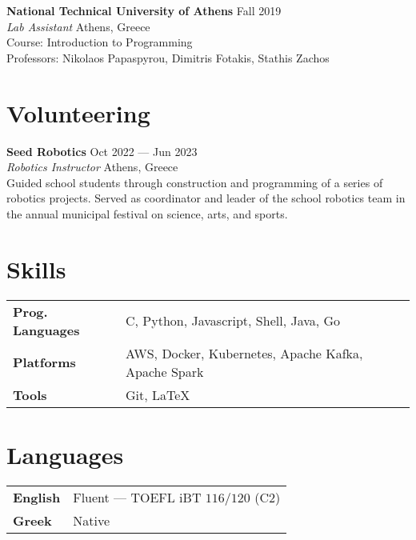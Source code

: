 \documentclass[margin, 12pt]{resume}
\newcommand{\sectionVSpace}{\vspace{-3.5ex}} %
\newcommand{\competition}[1]{\textbf{#1}\xspace}
\newcommand{\institution}[1]{\textbf{#1}\xspace}
\newcommand{\rSection}[1]{\sectionVSpace\section{#1}\xspace}
\newcommand{\role}[1]{\textit{#1}\xspace}
\newcommand{\stitle}[1]{#1:\xspace}
\begin{document}
\begin{resume}
    \institution{National Technical University of Athens} \hfill Fall 2019 \\
    \role{Lab Assistant} \hfill Athens, Greece \\
    \stitle{Course} Introduction to Programming \\
    \stitle{Professors} Nikolaos Papaspyrou, Dimitris Fotakis, Stathis Zachos \\

    \rSection{Volunteering}

    \institution{Seed Robotics} \hfill Oct 2022 --- Jun 2023 \\
    \role{Robotics Instructor} \hfill Athens, Greece \\
    Guided school students through construction and programming of a series of robotics projects. Served as coordinator and leader of the school robotics team in the annual municipal festival on science, arts, and sports. \\

    \rSection{Skills}

    \begin{tabular}{@{} >{\bfseries}l l @{}}
        Prog. Languages & C, Python, Javascript, Shell, Java, Go              \\
        Platforms       & AWS, Docker, Kubernetes, Apache Kafka, Apache Spark \\
        Tools           & Git, LaTeX
    \end{tabular}

    \vspace{1ex}

    \section{Languages}

    \begin{tabular}{@{} >{\bfseries}l l @{}}
        English & Fluent --- TOEFL iBT \( 116/120 \) (C2) \\
        Greek   & Native                                  \\
    \end{tabular}




\end{resume}
\end{document}
